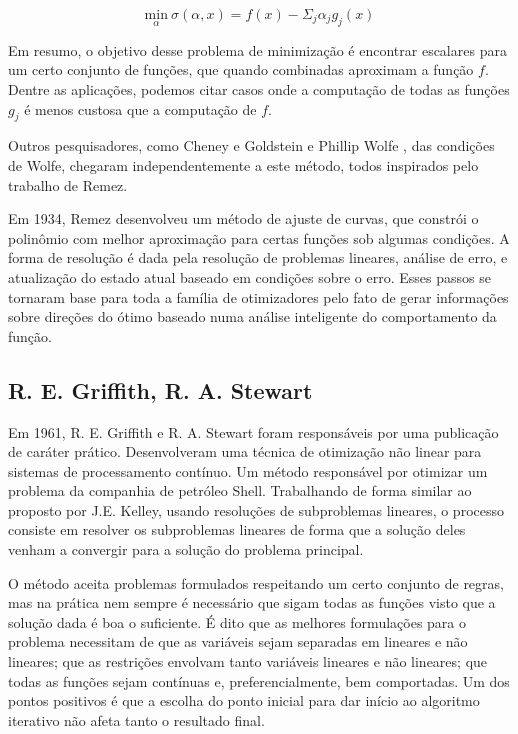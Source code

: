 \vspace{-15pt}
\begin{equation}
  \underset{\alpha}{\mathrm{min}}\ \sigma(\alpha, x) = f(x) - \Sigma_j \alpha_j g_j(x)
\end{equation}

Em resumo, o objetivo desse problema de minimização é encontrar escalares para um certo
conjunto de funções, que quando combinadas aproximam a função \(f\). Dentre as aplicações,
podemos citar casos onde a computação de todas as funções \(g_j\) é menos custosa que a
computação de \(f\).

Outros pesquisadores, como Cheney e Goldstein \cite{cheney1959newton} e Phillip Wolfe \cite{wolfe1960rand},
das condições de Wolfe, chegaram independentemente a este método, todos inspirados pelo trabalho de Remez.

Em 1934, Remez \cite{remez1934procede} desenvolveu um método de ajuste de curvas, que constrói o polinômio
com melhor aproximação para certas funções sob algumas condições. A forma de resolução é dada
pela resolução de problemas lineares, análise de erro, e atualização do estado atual baseado
em condições sobre o erro. Esses passos se tornaram base para toda a família de otimizadores
pelo fato de gerar informações sobre direções do ótimo baseado numa análise inteligente do
comportamento da função.

\subsection{R. E. Griffith, R. A. Stewart}

Em 1961, R. E. Griffith e R. A. Stewart \cite{griffith1961nonlinear} foram responsáveis por uma publicação
de caráter prático. Desenvolveram uma técnica de otimização não linear para sistemas de processamento
contínuo. Um método responsável por otimizar um problema da companhia de petróleo Shell. Trabalhando
de forma similar ao proposto por J.E. Kelley, usando resoluções de subproblemas lineares, o processo
consiste em resolver os subproblemas lineares de forma que a solução deles venham a convergir para
a solução do problema principal.

O método aceita problemas formulados respeitando um certo conjunto de regras, mas na prática nem
sempre é necessário que sigam todas as funções visto que a solução dada é boa o suficiente. É dito
que as melhores formulações para o problema necessitam de que as variáveis sejam separadas em lineares
e não lineares; que as restrições envolvam tanto variáveis lineares e não lineares; que todas as funções
sejam contínuas e, preferencialmente, bem comportadas. Um dos pontos positivos é que a escolha do ponto
inicial para dar início ao algoritmo iterativo não afeta tanto o resultado final.

